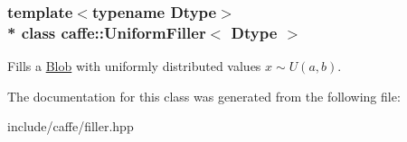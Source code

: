 \subsubsection*{template$<$typename Dtype$>$\\*
class caffe\+::\+Uniform\+Filler$<$ Dtype $>$}

Fills a \hyperlink{classcaffe_1_1Blob}{Blob} with uniformly distributed values $ x\sim U(a, b) $. 

The documentation for this class was generated from the following file\+:\begin{DoxyCompactItemize}
\item 
include/caffe/filler.\+hpp\end{DoxyCompactItemize}
